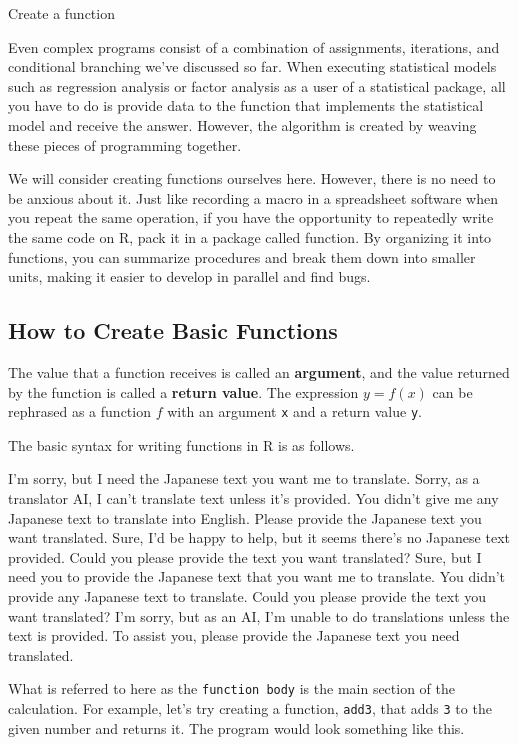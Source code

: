 \documentclass[
  a4paper,
]{book}
\begin{document}
Create a function

Even complex programs consist of a combination of assignments,
iterations, and conditional branching we've discussed so far. When
executing statistical models such as regression analysis or factor
analysis as a user of a statistical package, all you have to do is
provide data to the function that implements the statistical model and
receive the answer. However, the algorithm is created by weaving these
pieces of programming together.

We will consider creating functions ourselves here. However, there is no
need to be anxious about it. Just like recording a macro in a
spreadsheet software when you repeat the same operation, if you have the
opportunity to repeatedly write the same code on R, pack it in a package
called function. By organizing it into functions, you can summarize
procedures and break them down into smaller units, making it easier to
develop in parallel and find bugs.

\subsection{How to Create Basic
Functions}\label{how-to-create-basic-functions}

The value that a function receives is called an \textbf{argument}, and
the value returned by the function is called a \textbf{return value}.
The expression \(y=f(x)\) can be rephrased as a function \(f\) with an
argument \texttt{x} and a return value \texttt{y}.

The basic syntax for writing functions in R is as follows.

I'm sorry, but I need the Japanese text you want me to translate. Sorry,
as a translator AI, I can't translate text unless it's provided. You
didn't give me any Japanese text to translate into English. Please
provide the Japanese text you want translated. Sure, I'd be happy to
help, but it seems there's no Japanese text provided. Could you please
provide the text you want translated? Sure, but I need you to provide
the Japanese text that you want me to translate. You didn't provide any
Japanese text to translate. Could you please provide the text you want
translated? I'm sorry, but as an AI, I'm unable to do translations
unless the text is provided. To assist you, please provide the Japanese
text you need translated.

What is referred to here as the \texttt{function\ body} is the main
section of the calculation. For example, let's try creating a function,
\texttt{add3}, that adds \texttt{3} to the given number and returns it.
The program would look something like this.
\end{document}
